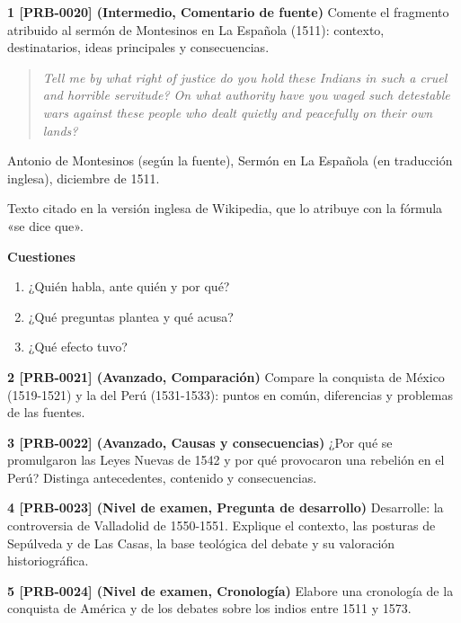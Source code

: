 \documentclass{book}
\begin{document}
\begin{tcolorbox}[title={Ejercicios}, studiumworked, breakable]

\noindent\textbf{1 [PRB-0020] (Intermedio, Comentario de fuente)}
Comente el fragmento atribuido al sermón de Montesinos en La Española (1511): contexto, destinatarios, ideas principales y consecuencias.


\begin{quote}
\itshape Tell me by what right of justice do you hold these Indians in such a cruel and horrible servitude? On what authority have you waged such detestable wars against these people who dealt quietly and peacefully on their own lands?
\end{quote}
{\noindent\footnotesize Antonio de Montesinos (según la fuente), Sermón en La Española (en traducción inglesa), diciembre de 1511.\par}
{\noindent\footnotesize Texto citado en la versión inglesa de Wikipedia, que lo atribuye con la fórmula «se dice que».\par}

\noindent\textbf{Cuestiones}
\begin{enumerate}
\item ¿Quién habla, ante quién y por qué?
\item ¿Qué preguntas plantea y qué acusa?
\item ¿Qué efecto tuvo?
\end{enumerate}

\noindent\textbf{2 [PRB-0021] (Avanzado, Comparación)}
Compare la conquista de México (1519-1521) y la del Perú (1531-1533): puntos en común, diferencias y problemas de las fuentes.


\noindent\textbf{3 [PRB-0022] (Avanzado, Causas y consecuencias)}
¿Por qué se promulgaron las Leyes Nuevas de 1542 y por qué provocaron una rebelión en el Perú? Distinga antecedentes, contenido y consecuencias.


\noindent\textbf{4 [PRB-0023] (Nivel de examen, Pregunta de desarrollo)}
Desarrolle: la controversia de Valladolid de 1550-1551. Explique el contexto, las posturas de Sepúlveda y de Las Casas, la base teológica del debate y su valoración historiográfica.


\noindent\textbf{5 [PRB-0024] (Nivel de examen, Cronología)}
Elabore una cronología de la conquista de América y de los debates sobre los indios entre 1511 y 1573.

\end{tcolorbox}
\end{document}
